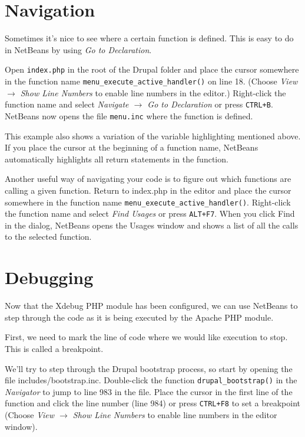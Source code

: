 \documentclass[draft,ebook,10pt,twoside,openright]{memoir}
\begin{document}
\section{Navigation}

Sometimes it’s nice to see where a certain function is defined. This is easy to do in NetBeans by using \emph{Go to Declaration}.

Open \verb!index.php! in the root of the Drupal folder and place the cursor somewhere in the function name \verb!menu_execute_active_handler()! on line 18. (Choose \emph{View $\rightarrow$ Show Line Numbers} to enable line numbers in the editor.) Right-click the function name and select \emph{Navigate $\rightarrow$ Go to Declaration} or press \verb!CTRL+B!. NetBeans now opens the file \verb!menu.inc! where the function is defined.

This example also shows a variation of the variable highlighting mentioned above. If you place the cursor at the beginning of a function name, NetBeans automatically highlights all return statements in the function.

Another useful way of navigating your code is to figure out which functions are calling a given function. Return to index.php in the editor and place the cursor somewhere in the function name \verb!menu_execute_active_handler()!. Right-click the function name and select \emph{Find Usages} or press \verb!ALT+F7!. When you click Find in the dialog, NetBeans opens the Usages window and shows a list of all the calls to the selected function.


\section{Debugging}

Now that the Xdebug PHP module has been configured, we can use NetBeans to step through the code as it is being executed by the Apache PHP module.

First, we need to mark the line of code where we would like execution to stop. This is called a breakpoint.

We’ll try to step through the Drupal bootstrap process, so start by opening the file includes/bootstrap.inc. Double-click the function \verb!drupal_bootstrap()! in the \emph{Navigator} to jump to line 983 in the file. Place the cursor in the first line of the function and click the line number (line 984) or press \verb!CTRL+F8! to set a breakpoint (Choose \emph{View $\rightarrow$ Show Line Numbers} to enable line numbers in the editor window).
\end{document}

